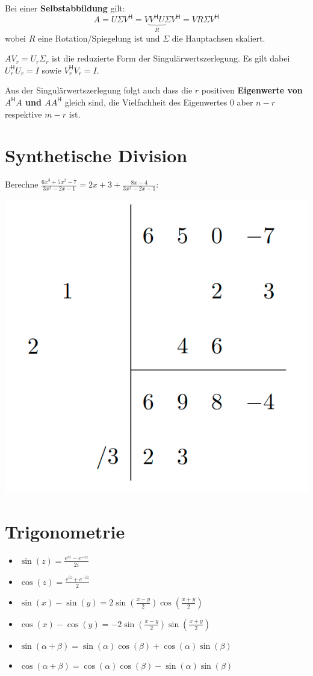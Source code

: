 \documentclass[a4paper,10pt]{article}
\newcommand*{\hermconj}{\mathsf{H}}
\begin{document}
Bei einer \textbf{Selbstabbildung} gilt:
$$A = U \Sigma V^\hermconj = V \underbrace{V^\hermconj U}_R \Sigma V^\hermconj = V R \Sigma V^\hermconj$$
wobei $R$ eine Rotation/Spiegelung ist und $\Sigma$ die Hauptachsen skaliert.

$A V_r = U_r \Sigma_r$ ist die reduzierte Form der Singulärwertszerlegung. Es gilt dabei $U_r^\hermconj U_r = I$ sowie $V_r^\hermconj V_r = I$.

Aus der Singulärwertszerlegung folgt auch dass die $r$ positiven \textbf{Eigenwerte von $A^\hermconj A$ und $AA^\hermconj$} gleich sind, die Vielfachheit des Eigenwertes $0$ aber $n-r$ respektive $m-r$ ist.

\section{Synthetische Division}
Berechne $\frac{6x^3 + 5x^2 - 7}{3x^2 - 2x - 1} = 2x + 3 + \frac{8x - 4}{3x^2 -2x - 1}$:\\
\begin{center}
  \includegraphics[width=0.4 \linewidth]{synthetic-division.png}
\end{center}

\section{Trigonometrie}

\begin{itemize}
  \item $\sin(z) = \frac{e^{iz} - e^{-iz}}{2i}$
  \item $\cos(z) = \frac{e^{iz} + e^{-iz}}{2}$
  \item $\sin(x) - \sin(y) = 2\sin(\frac{x - y}{2})\cos(\frac{x + y}{2})$
  \item $\cos(x) - \cos(y) = -2\sin(\frac{x - y}{2})\sin(\frac{x + y}{2})$
  \item $\sin(\alpha + \beta) = \sin(\alpha) \cos(\beta) + \cos(\alpha) \sin(\beta)$
  \item $\cos(\alpha + \beta) = \cos(\alpha) \cos(\beta) - \sin(\alpha) \sin(\beta)$
\end{itemize}
\end{document}
